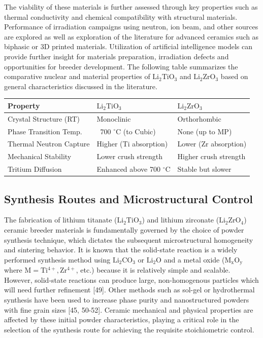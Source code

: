 \documentclass[review,12pt,a4paper]{elsarticle}
\begin{document}
\textcolor{medconf}{The viability of these materials is further assessed through key properties such as thermal conductivity and chemical compatibility with structural materials. Performance of irradiation campaigns using neutron, ion beam, and other sources are explored as well as exploration of the literature for advanced ceramics such as biphasic or 3D printed materials. Utilization of artificial intelligence models can provide further insight for materials preparation, irradiation defects and opportunities for breeder development. The following table summarizes the comparative nuclear and material properties of $\mathrm{Li_2TiO_3}$ and $\mathrm{Li_2ZrO_3}$ based on general characteristics discussed in the literature.}


\begin{table}[htb]
\centering
\begin{tabular}{lll}
\hline
Property & $\mathrm{Li_2TiO_3}$ & $\mathrm{Li_2ZrO_3}$ \\
\hline
Crystal Structure (RT) & Monoclinic & Orthorhombic \\
Phase Transition Temp. & ~700 $^{\circ}$C (to Cubic) & None (up to MP) \\
Thermal Neutron Capture & Higher (Ti absorption) & Lower (Zr absorption) \\
Mechanical Stability & Lower crush strength & Higher crush strength \\
Tritium Diffusion & Enhanced above 700 $^{\circ}$C & Stable but slower \\
\hline
\end{tabular}
\end{table}

\subsection{Synthesis Routes and Microstructural Control}


\textcolor{medconf}{The fabrication of lithium titanate ($\mathrm{Li_2TiO_3}$) and lithium zirconate ($\mathrm{Li_2ZrO_4}$) ceramic breeder materials is fundamentally governed by the choice of powder synthesis technique, which dictates the subsequent microstructural homogeneity and sintering behavior. It is known that the solid-state reaction is a widely performed synthesis method using $\mathrm{Li_2CO_3}$ or $\mathrm{Li_2O}$ and a metal oxide ($\mathrm{M_xO_y}$ where $\mathrm{M = Ti^{4+}, Zr^{4+}}$, etc.) because it is relatively simple and scalable. However, solid-state reactions can produce large, non-homogenous particles which will need further refinement [49]. Other methods such as sol-gel or hydrothermal synthesis have been used to increase phase purity and nanostructured powders with fine grain sizes [45, 50-52]. Ceramic mechanical and physical properties are affected by these initial powder characteristics, playing a critical role in the selection of the synthesis route for achieving the requisite stoichiometric control.}
\end{document}
